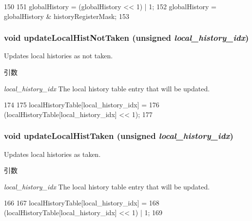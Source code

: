 \begin{DoxyCode}
150 {
151     globalHistory = (globalHistory << 1) | 1;
152     globalHistory = globalHistory & historyRegisterMask;
153 }
\end{DoxyCode}
\hypertarget{classTournamentBP_a7be8a3b2838c05c1199ae3490e0c4a31}{
\subsubsection[{updateLocalHistNotTaken}]{\setlength{\rightskip}{0pt plus 5cm}void updateLocalHistNotTaken (unsigned {\em local\_\-history\_\-idx})}}
\label{classTournamentBP_a7be8a3b2838c05c1199ae3490e0c4a31}
Updates local histories as not taken. 
\begin{DoxyParams}{引数}
\item[{\em local\_\-history\_\-idx}]The local history table entry that will be updated. \end{DoxyParams}



\begin{DoxyCode}
174 {
175     localHistoryTable[local_history_idx] =
176         (localHistoryTable[local_history_idx] << 1);
177 }
\end{DoxyCode}
\hypertarget{classTournamentBP_a4f9579428ce30b76c76e2c6bdc876672}{
\subsubsection[{updateLocalHistTaken}]{\setlength{\rightskip}{0pt plus 5cm}void updateLocalHistTaken (unsigned {\em local\_\-history\_\-idx})}}
\label{classTournamentBP_a4f9579428ce30b76c76e2c6bdc876672}
Updates local histories as taken. 
\begin{DoxyParams}{引数}
\item[{\em local\_\-history\_\-idx}]The local history table entry that will be updated. \end{DoxyParams}



\begin{DoxyCode}
166 {
167     localHistoryTable[local_history_idx] =
168         (localHistoryTable[local_history_idx] << 1) | 1;
169 }
\end{DoxyCode}


